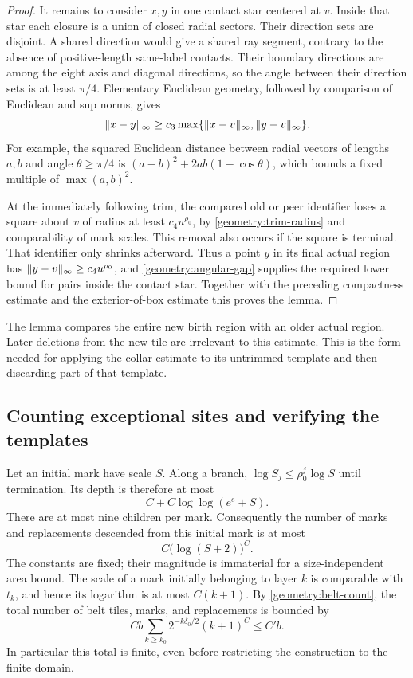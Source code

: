 \begin{proof}
It remains to consider $x,y$ in one contact star centered at $v$.
Inside that star each closure is a union of closed radial sectors.
Their direction sets are disjoint.  A shared direction would give a
shared ray segment, contrary to the absence of positive-length
same-label contacts.  Their boundary directions are among the eight
axis and diagonal directions, so the angle between their direction sets
is at least $\pi/4$.  Elementary Euclidean geometry, followed by
comparison of Euclidean and sup norms, gives
\begin{equation}
\label{geometry:angular-gap}
 \lVert x-y\rVert_\infty
 \ge c_3\max\{\lVert x-v\rVert_\infty,\lVert y-v\rVert_\infty\}.
\end{equation}
For example, the squared Euclidean distance between radial vectors of
lengths $a,b$ and angle $\theta\ge\pi/4$ is
$(a-b)^2+2ab(1-\cos\theta)$, which bounds a fixed multiple of
$\max(a,b)^2$.

At the immediately following trim, the compared old or peer identifier
loses a square about $v$ of radius at least $c_4u^{\rho_0}$, by
\eqref{geometry:trim-radius} and comparability of mark scales.  This
removal also occurs if the square is terminal.  That identifier only
shrinks afterward.  Thus a point $y$ in its final actual region has
$\lVert y-v\rVert_\infty\ge c_4u^{\rho_0}$, and
\eqref{geometry:angular-gap} supplies the required lower bound for pairs
inside the contact star.  Together with the preceding compactness
estimate and the exterior-of-box estimate this proves the lemma.
\end{proof}

The lemma compares the entire new birth region with an older actual
region.  Later deletions from the new tile are irrelevant to this
estimate.  This is the form needed for applying the collar estimate to
its untrimmed template and then discarding part of that template.

\subsection{Counting exceptional sites and verifying the templates}

Let an initial mark have scale $S$.  Along a branch,
$\log S_j\le\rho_0^j\log S$ until termination.  Its depth is therefore at
most
\[
 C+C\log\log(e^e+S).
\]
There are at most nine children per mark.  Consequently the number of
marks and replacements descended from this initial mark is at most
\begin{equation}
\label{geometry:descendant-count}
 C\bigl(\log(S+2)\bigr)^{C}.
\end{equation}
The constants are fixed; their magnitude is immaterial for a
size-independent area bound.  The scale of a mark initially belonging to
layer $k$ is comparable with $t_k$, and hence its logarithm is at most
$C(k+1)$.  By \eqref{geometry:belt-count}, the total number of belt tiles,
marks, and replacements is bounded by
\begin{equation}
\label{geometry:total-repairs}
 Cb\sum_{k\ge k_0}2^{-k\delta_0/2}(k+1)^C\le C'b.
\end{equation}
In particular this total is finite, even before restricting the
construction to the finite domain.


